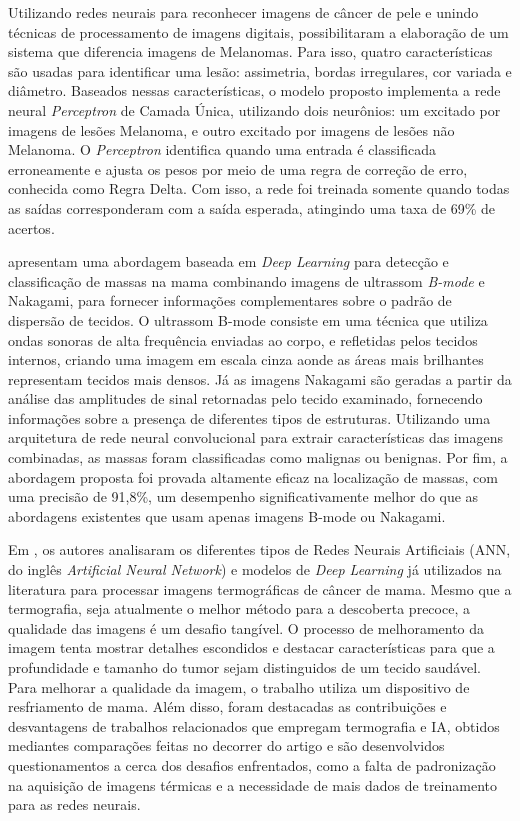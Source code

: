 Utilizando redes neurais para reconhecer imagens de câncer de pele e unindo técnicas de processamento de imagens digitais,  possibilitaram a elaboração de um sistema que diferencia imagens de Melanomas. Para isso, quatro características são usadas para identificar uma lesão: assimetria, bordas irregulares, cor variada e diâmetro. Baseados nessas características, o modelo proposto implementa a rede neural \textit{Perceptron} de Camada Única, utilizando dois neurônios: um excitado por imagens de lesões Melanoma, e outro excitado por imagens de lesões não Melanoma. O \textit{Perceptron} identifica quando uma entrada é classificada erroneamente e ajusta os pesos por meio de uma regra de correção de erro, conhecida como Regra Delta. Com isso, a rede foi treinada somente quando todas as saídas corresponderam com a saída esperada, atingindo uma taxa de 69\% de acertos.

 apresentam uma abordagem baseada em \textit{Deep Learning} para detecção e classificação de massas na mama combinando imagens de ultrassom \textit{B-mode} e Nakagami, para fornecer informações complementares sobre o padrão de dispersão de tecidos. O ultrassom B-mode consiste em uma técnica que utiliza ondas sonoras de alta frequência enviadas ao corpo, e refletidas pelos tecidos internos, criando uma imagem em escala cinza aonde as áreas mais brilhantes representam tecidos mais densos. Já as imagens Nakagami são geradas a partir da análise das amplitudes de sinal retornadas pelo tecido examinado, fornecendo informações sobre a presença de diferentes tipos de estruturas. Utilizando uma arquitetura de rede neural convolucional para extrair características das imagens combinadas, as massas foram classificadas como malignas ou benignas. Por fim, a abordagem proposta foi provada altamente eficaz na localização de massas, com uma precisão de 91,8\%, um desempenho significativamente melhor do que as abordagens existentes que usam apenas imagens B-mode ou Nakagami.

Em , os autores analisaram os diferentes tipos de Redes Neurais Artificiais (ANN, do inglês \textit{Artificial Neural Network}) e modelos de \textit{Deep Learning} já utilizados na literatura para processar imagens termográficas de câncer de mama. Mesmo que a termografia, seja atualmente o melhor método para a descoberta precoce, a qualidade das imagens é um desafio tangível. O processo de melhoramento da imagem tenta mostrar detalhes escondidos e destacar características para que a profundidade e tamanho do tumor sejam distinguidos de um tecido saudável. Para melhorar a qualidade da imagem, o trabalho utiliza um dispositivo de resfriamento de mama. Além disso, foram destacadas as contribuições e desvantagens de trabalhos relacionados que empregam termografia e IA, obtidos mediantes comparações feitas no decorrer do artigo e são desenvolvidos questionamentos a cerca dos desafios enfrentados, como a falta de padronização na aquisição de imagens térmicas e a necessidade de mais dados de treinamento para as redes neurais. 

